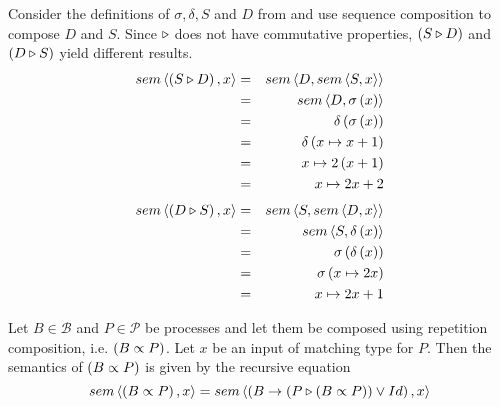 \begin{example}
\label{exp:sem_sequence}
Consider the definitions of $\sigma, \delta, S$ and $D$ from  and use sequence composition to compose $D$ and $S$. Since $\triangleright$ does not have commutative properties, $\left( S \triangleright D \right)$ and $\left( D \triangleright S \right)$ yield different results.
  \begin{eqnarray*}
    sem \left\langle \left( S \triangleright D \right), x \right\rangle & = & sem \left\langle D, sem \left\langle S, x \right\rangle \right\rangle \\
                             & = & sem \left\langle D, \sigma \left( x \right) \right\rangle \\
                             & = & \delta \left( \sigma \left( x \right) \right) \\
                             & = & \delta \left( x \mapsto x+1 \right) \\
                             & = & x \mapsto 2 \left( x+1 \right) \\
                             & = & x \mapsto 2x+2
  \end{eqnarray*}
  \begin{eqnarray*}
    sem \left\langle \left( D \triangleright S \right), x \right\rangle & = & sem \left\langle S, sem \left\langle D, x \right\rangle \right\rangle \\
                             & = & sem \left\langle S, \delta \left( x \right) \right\rangle \\
                             & = & \sigma \left( \delta \left( x \right) \right) \\
                             & = & \sigma \left( x \mapsto 2x \right) \\
                             & = & x \mapsto 2x + 1
  \end{eqnarray*}
  \hfill\qedsymbol
\end{example}



\begin{definition}
\label{def:sem_repetition}
Let $B \in \mathcal{B}$ and $P \in \mathcal{P}$ be processes and let them be composed using repetition composition, i.e. $\left( B \propto P \right)$. Let $x$ be an input of matching type for $P$. Then the semantics of $\left( B \propto P \right)$ is given by the recursive equation
  \begin{equation}
    \label{eqn_sem_repetition}
    sem \left\langle \left( B \propto P \right), x \right\rangle = sem \left\langle \left( B \to \left( P \triangleright \left( B \propto P \right) \right) \vee Id \right), x \right\rangle
  \end{equation}

\hfill\qedsymbol
\end{definition}

